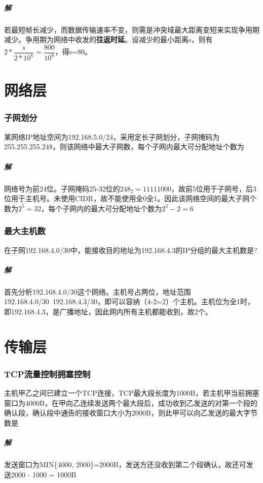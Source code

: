 \subparagraph{解}
若最短帧长减少，而数据传输速率不变，则需是冲突域最大距离变短来实现争用期减少。争用期为网络中收发的\textbf{往返时延}。设减少的最小距离s，则有\(2 * \dfrac{s}{2 * 10^8} = \dfrac{800}{10^9}\)，得s=80。


\section{网络层}

\subsubsection{子网划分}
某网络IP地址空间为192.168.5.0/24，采用定长子网划分，子网掩码为255.255.255.248，则该网络中最大子网数，每个子网内最大可分配地址个数为

\subparagraph{解}
网络号为前24位。子网掩码25-32位的\(248_2 = 11111000\)，故前5位用于子网号，后3位用于主机号。未使用CIDR，故不能使用全0全1。因此该网络空间的最大子网个数为\(2^5 = 32\)，每个子网内的最大可分配地址个数为\(2^3 - 2 = 6\)


\subsubsection{最大主机数}
在子网192.168.4.0/30中，能接收目的地址为192.168.4.3的IP分组的最大主机数是?

\subparagraph{解}
首先分析192.168.4.0/30这个网络。主机号占两位，地址范围192.168.4.0/30~192.168.4.3/30，即可以容纳（4-2=2）个主机。主机位为全1时，即192.168.4.3，是广播地址，因此网内所有主机都能收到，故2个。


\section{传输层}

\subsubsection{TCP流量控制拥塞控制}
主机甲乙之间已建立一个TCP连接，TCP最大段长度为1000B，若主机甲当前拥塞窗口为4000B，在甲向乙连续发送两个最大段后，成功收到乙发送的对第一个段的确认段，确认段中通告的接收窗口大小为2000B，则此甲可以向乙发送的最大字节数是

\subparagraph{解}
发送窗口为MIN\{4000, 2000\}=2000B，发送方还没收到第二个段确认，故还可发送2000 - 1000 = 1000B


